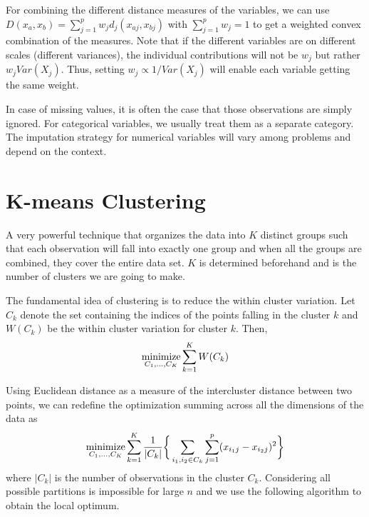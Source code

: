 \documentclass[../statistical_learning_notes.tex]{subfiles}
\begin{document}
    For combining the different distance measures of the variables, we can use \\$D(x_{a}, x_{b}) = \sum_{j=1}^{p} w_{j} d_{j}(x_{aj}, x_{bj})$ with $\sum_{j=1}^{p} w_{j} = 1$ to get a weighted convex combination of the measures. Note that if the different variables are on different scales (different variances), the individual contributions will not be $w_{j}$ but rather $w_{j} Var(X_{j})$. Thus, setting $w_{j} \propto 1/Var(X_{j})$ will enable each variable getting the same weight.\newline

    In case of missing values, it is often the case that those observations are simply ignored. For categorical variables, we usually treat them as a separate category. The imputation strategy for numerical variables will vary among problems and depend on the context.

    \section{K-means Clustering}
    A very powerful technique that organizes the data into $K$ distinct groups such that each observation will fall into exactly one group and when all the groups are combined, they cover the entire data set. $K$ is determined beforehand and is the number of clusters we are going to make.\newline

    The fundamental idea of clustering is to reduce the within cluster variation. Let $C_{k}$ denote the set containing the indices of the points falling in the cluster $k$ and $W(C_{k})$ be the within cluster variation for cluster $k$. Then,
    \begin{align*}
        \operatorname*{minimize}_{C_{1},\ldots,C_{K}} \sum_{k=1}^{K} W(C_{k})
    \end{align*}

    Using Euclidean distance as a measure of the intercluster distance between two points, we can redefine the optimization summing across all the dimensions of the data as
    \begin{align*}
        \operatorname*{minimize}_{C_{1},\ldots,C_{K}} \sum_{k=1}^{K} \frac{1}{\vert C_{k} \vert} \bigg\{\sum_{i_{1}, i_{2} \in C_{k}} \sum_{j=1}^{p} (x_{i_{1}j} - x_{i_{2}j})^{2} \bigg \}
    \end{align*}
    where $\vert C_{k} \vert$ is the number of observations in the cluster $C_{k}$. Considering all possible partitions is impossible for large $n$ and we use the following algorithm to obtain the local optimum.
\end{document}
